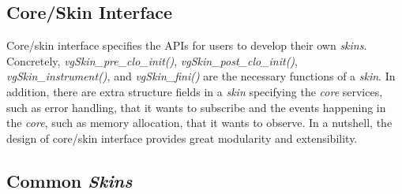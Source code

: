 \subsection{Core/Skin Interface}
Core/skin interface specifies the APIs for users to develop their own \textit{skins}. Concretely, \textit{vgSkin\_pre\_clo\_init()}, \textit{vgSkin\_post\_clo\_init()}, \textit{vgSkin\_instrument()}, and \textit{vgSkin\_fini()} are the necessary functions of a \textit{skin}. In addition, there are extra structure fields in a \textit{skin} specifying the \textit{core} services, such as error handling, that it wants to subscribe and the events happening in the \textit{core}, such as memory allocation, that it wants to observe. In a nutshell, the design of core/skin interface provides great modularity and extensibility.

\subsection{Common \textit{Skins}}
\label{subsec:callgrind}

